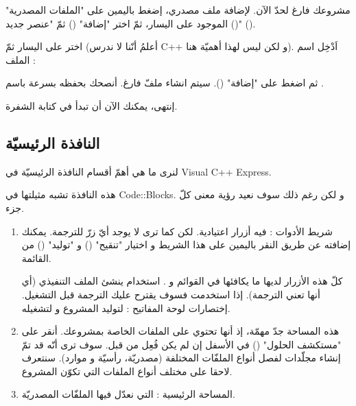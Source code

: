 مشروعك فارغ لحدّ الآن. لإضافة ملف مصدري، إضغط باليمين على
"الملفات المصدرية"
()
الموجود على اليسار، ثمّ اختر
"إضافة"
()
ثمّ
"عنصر جديد"
().


اختر
على اليسار ثمّ
(أعلمُ أنّنا لا ندرس
\textenglish{C++}
و لكن ليس لهذا أهميّة هنا). اَدْخِل اسم الملف :


ثم اضغط على
"إضافة"
().
سيتم انشاء ملفّ فارغ. أنصحك بحفظه بسرعة باسم
.

إنتهى، يمكنك الآن أن تبدأ في كتابة الشفرة.

\subsection{النافذة الرئيسيّة}

لنرى ما هي أهمّ أقسام النافذة الرئيسيّة في
\textenglish{Visual C++ Express}.


هذه النافذة تشبه مثيلتها في
\textenglish{Code::Blocks}.
و لكن رغم ذلك سوف نعيد رؤية معنى كلّ جزء.

\begin{enumerate}
  \item شريط الأدوات : فيه أزرار اعتيادية. لكن كما ترى لا يوجد أيّ زرّ للترجمة. يمكنك إضافته عن طريق النقر باليمين على هذا الشريط و اختيار
"تنقيح"
()
و
"توليد"
()
من القائمة.

كلّ هذه الأزرار لديها ما يكافئها في القوائم
و
.
استخدام
ينشئ الملف التنفيذي (أي أنها تعني الترجمة). إذا استخدمت
فسوف يقترح عليك الترجمة قبل التشغيل. إختصارات لوحة المفاتيح :
لتوليد المشروع و
لتشغيله.
  \item هذه المساحة جدّ مهمّة، إذ أنها تحتوي على الملفات الخاصة بمشروعك. أنقر على
"مستكشف الحلول"
()
في الأسفل إن لم يكن فُعِل من قبل. سوف ترى أنّه قد تمّ إنشاء مجلّدات لفصل أنواع الملفّات المختلفة (مصدريّة، رأسيّة و موارد). سنتعرف لاحقا على مختلف أنواع الملفات التي تكوّن المشروع.
  \item المساحة الرئيسية : التي نعدّل فيها الملفّات المصدريّة.
\end{enumerate}

